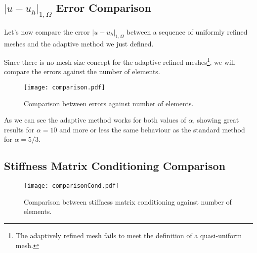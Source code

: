 \subsection[Error Comparison]{$|u - u_h|_{1, \Omega}$ Error Comparison}

Let's now compare the error $|u - u_h|_{1, \Omega}$ between a sequence of uniformly refined meshes and the adaptive method we just defined.

Since there is no mesh size concept for the adaptive refined meshes\footnote{The adaptively refined mesh fails to meet the definition of a quasi-uniform mesh.}, we will compare the errors against the number of elements.

\begin{figure}[!ht]
	\centering
	\texttt{[image: comparison.pdf]}
	\caption{Comparison between errors against number of elements.}
\end{figure}

As we can see the adaptive method works for both values of $\alpha$, showing great results for $\alpha = 10$ and more or less the same behaviour as the standard method for $\alpha = 5/3$.

\newpage
\begin{multicols}{2}
	
\end{multicols}

\newpage
\subsection{Stiffness Matrix Conditioning Comparison}

\begin{figure}[!ht]
	\centering
	\texttt{[image: comparisonCond.pdf]}
	\caption{Comparison between stiffness matrix conditioning against number of elements.}
\end{figure}

\newpage
\begin{multicols}{2}
	
\end{multicols}